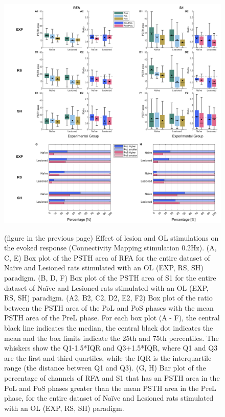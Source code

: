\begin{figure}[htp]
    \begin{center}
    \includegraphics[width=\linewidth]{Figure/Ratio PSTH area separate/ratio all PSTH area 0.2Hz.jpg}
    \end{center}
\end{figure}
\begin{figure}[p!]
    \caption{(figure in the previous page) Effect of lesion and OL stimulations on the evoked response (Connectivity Mapping stimulation 0.2Hz). (A, C, E) Box plot of the PSTH area of RFA for the entire dataset of Naïve and Lesioned rats stimulated with an OL (EXP, RS, SH) paradigm. (B, D, F) Box plot of the PSTH area of S1 for the entire dataset of Naïve and Lesioned rats stimulated with an OL (EXP, RS, SH) paradigm. (A2, B2, C2, D2, E2, F2) Box plot of the ratio between the PSTH area of the PoL and PoS phases with the mean PSTH area of the PreL phase. For each box plot (A - F), the central black line indicates the median, the central black dot indicates the mean and the box limits indicate the 25th and 75th percentiles. The whiskers show the Q1-1.5*IQR and Q3+1.5*IQR, where Q1 and Q3 are the first and third quartiles, while the IQR is the interquartile range (the distance between Q1 and Q3). (G, H) Bar plot of the percentage of channels of RFA and S1 that has an PSTH area in the PoL and PoS phases greater than the mean PSTH area in the PreL phase, for the entire dataset of Naïve and Lesioned rats stimulated with an OL (EXP, RS, SH) paradigm.}
    \label{fig:ratio all PSTH area 0.2Hz}
\end{figure}
\clearpage

